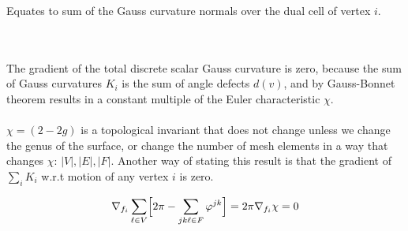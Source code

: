 \documentclass{article}
\begin{document}
Equates to sum of the Gauss curvature normals over the dual cell of vertex $i$.


\vspace{1.8cm}
\\\\


The gradient of the total discrete scalar Gauss curvature is zero, because the sum of Gauss curvatures $K_i$ is 
the sum of angle defects $d(v)$, and by Gauss-Bonnet theorem results in a constant multiple of the Euler characteristic $\chi$.\\\\
$\chi = (2 - 2g)$ is a topological invariant that does not change unless we change the genus of the surface,
or change the number of mesh elements in a way that changes $\chi$: $|V|, |E|, |F|$. 
Another way of stating this result is that the gradient of $\sum_i K_i$ w.r.t motion of any vertex $i$ is zero.

$$
\nabla_{f_i} \sum_{\ell \in V} \Bigl[2\pi - \sum_{jk\ell \in F} \varphi^{jk}\Bigr]
= 2\pi \nabla_{f_i}\chi
= 0
$$    
\end{document}
